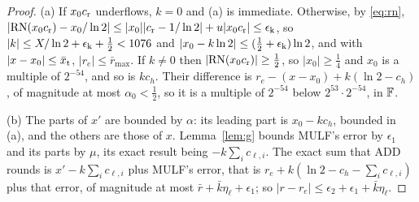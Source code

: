 \begin{proof}
(a) If $x_0c_{\rm r}$ underflows, $k = 0$ and (a) is immediate. Otherwise, by \eqref{eq:rn}, $|\mathrm{RN}(x_0c_{\rm r}) -
x_0/\ln 2| \le |x_0||c_{\rm r} - 1/\ln 2| + u|x_0c_{\rm r}| \le \epsilon_{\rm k}$, so $|k|
\le X/\ln 2 + \epsilon_{\rm k} + \frac12 < 1076$ and $|x_0 - k\ln 2| \le (\frac12 + \epsilon_{\rm k})\ln 2$, and with $|x - x_0| \le
\bar x_{\rm t}$, $|r_e| \le \bar r_{\max}$. If $k \ne 0$ then $|\mathrm{RN}(x_0c_{\rm r})| \ge \frac12$, so $|x_0| \ge \frac14$ and $x_0$ is a
multiple of $2^{-54}$, and so is $kc_h$. Their difference is $r_e - (x - x_0) + k(\ln 2 - c_h)$, of magnitude at most
$\alpha_0 < \frac12$, so it is a multiple of $2^{-54}$ below $2^{53}\cdot 2^{-54}$, in $\mathbb{F}$.

(b) The parts of $x'$ are bounded by $\alpha$: its leading part is $x_0 - kc_h$, bounded in (a), and the others are
those of $x$. Lemma~\ref{lem:g} bounds MULF's error by $\epsilon_1$ and its parts by $\mu$, its exact result being
$-k\sum_ic_{\ell,i}$. The exact sum that ADD rounds is $x' - k\sum_ic_{\ell,i}$ plus MULF's error, that is $r_e +
k(\ln 2 - c_h - \sum_i c_{\ell,i})$ plus that error, of magnitude at most $\bar r + \bar k\eta_\ell + \epsilon_1$; so
$|r - r_e| \le \epsilon_2 + \epsilon_1 + \bar k\eta_\ell$.
\end{proof}

